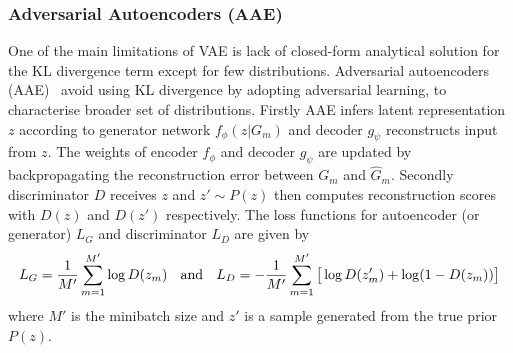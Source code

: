 \subsubsection{Adversarial Autoencoders (AAE)}
\label{sec:aae}
One of the main limitations of VAE is lack of closed-form analytical solution for the KL divergence term except for few distributions. Adversarial autoencoders (AAE)~\cite{makhzani2015adversarial} avoid using KL divergence by adopting adversarial learning, to characterise broader set of distributions.   Firstly AAE infers latent representation $z$  according to generator network $f_\phi(z|G_m)$ and decoder $g_\psi$ reconstructs input %
  from $z$.  The weights of encoder $f_\phi$ and decoder $g_\psi$ are updated by backpropagating the reconstruction error between $ G_m$ and $\hat G_m$. 
Secondly discriminator $D$ receives $z$ and %
$z' \sim P(z)$ then computes reconstruction scores  with $D(z)$ and $D(z')$ respectively. %
The loss functions for autoencoder (or generator) $L_G$ and %
 discriminator $L_D$ are given by  
\begin{equation}
\begin{aligned}
{L_G} = \frac{1}{M'} \sum_{m=1}^{M'} \log D(z_m) \mbox{ \;  and \; } L_D = -\frac{1}{M'} \sum_{m=1}^{M'} \big [\log D(z'_m)+ \log(1- D(z_m)) \big ]
\end{aligned}
\label{eqn:aaeloss}
\end{equation}
where $M'$ is the minibatch size %
and $z'$ is a sample generated from the true prior $P(z)$.
